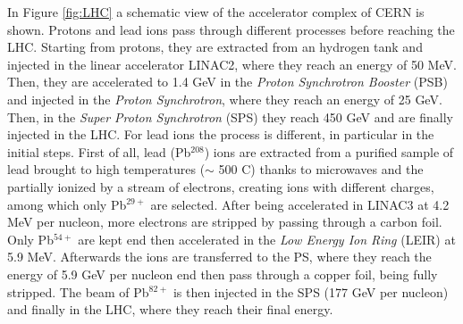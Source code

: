 In Figure \ref{fig:LHC} a schematic view of the accelerator complex of CERN is shown. Protons and lead ions pass through different processes before reaching the LHC. Starting from protons, they are extracted from an hydrogen tank and injected in the linear accelerator LINAC2, where they reach an energy of 50 MeV. Then, they are accelerated to 1.4 GeV in the \textit{Proton Synchrotron Booster} (PSB) and injected in the \textit{Proton Synchrotron}, where they reach an energy of 25 GeV. Then, in the \textit{Super Proton Synchrotron} (SPS) they reach 450 GeV and are finally injected in the LHC. For lead ions the process is different, in particular in the initial steps. First of all, lead (Pb$^{208}$) ions are extracted from a purified sample of lead brought to high temperatures ($\sim$ 500 \textdegree C) thanks to microwaves and the partially ionized by a stream of electrons, creating ions with different charges, among which only Pb$^{29+}$ are selected. After being accelerated in LINAC3 at 4.2 MeV per nucleon, more electrons are stripped by passing through a carbon foil. Only Pb$^{54+}$ are kept end then accelerated in the \textit{Low Energy Ion Ring} (LEIR) at 5.9 MeV. Afterwards the ions are transferred to the PS, where they reach the energy of 5.9 GeV per nucleon end then pass through a copper foil, being fully stripped. The beam of Pb$^{82+}$ is then injected in the SPS (177 GeV per nucleon) and finally in the LHC, where they reach their final energy.
